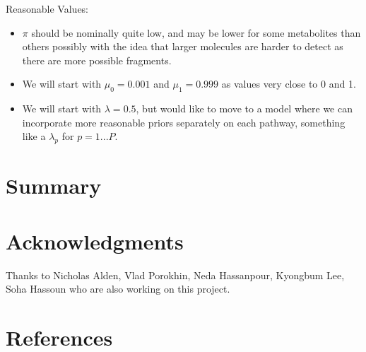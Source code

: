 \documentclass[11pt]{article}
\begin{document}
Reasonable Values:
\begin{itemize}
\item $\pi$ should be nominally quite low, and may be lower for some metabolites than others possibly with the idea that larger molecules are harder to detect as there are more possible fragments.
\item We will start with $\mu_0 = 0.001$ and $\mu_1 = 0.999$ as values very close to 0 and 1. 
\item We will start with $\lambda = 0.5$, but would like to move to a model where we can incorporate more reasonable priors separately on each pathway, something like a $\lambda_p$ for $p = 1...P$. 

\end{itemize}

\section{Summary}



\section{Acknowledgments}

Thanks to Nicholas Alden, Vlad Porokhin, Neda Hassanpour, Kyongbum Lee, Soha Hassoun who are also working on this project.

\section{References}



\end{document}
